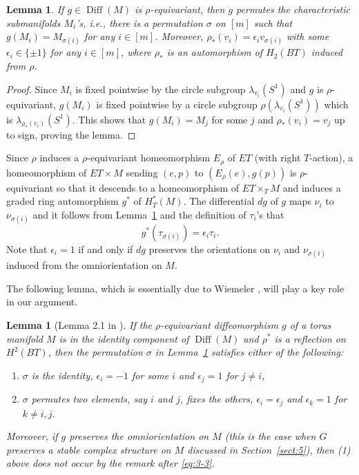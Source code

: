 \documentclass[12pt]{amsart}
\theoremstyle{plain} \numberwithin{equation}{section}
\newtheorem{lemm}[theo]{Lemma}
\theoremstyle{definition}
\def\fg{g}
\DeclareMathOperator{\Diff}{Diff}
\begin{document}
\begin{lemm} \label{lemm:3-3}
If $\fg\in \Diff(M)$ is $\rho$-equivariant, then $\fg$ permutes the characteristic submanifolds $M_i$'s, i.e., there is a permutation $\sigma$ on $[m]$ such that $\fg(M_i)=M_{\sigma(i)}$ for any $i\in [m]$.  Moreover, $\rho_*(v_i)=\epsilon_i v_{\sigma(i)}$ with some $\epsilon_i\in \{\pm 1\}$ for any $i\in [m]$, where $\rho_*$ is an automorphism of $H_2(BT)$ induced from $\rho$. 
\end{lemm}

\begin{proof}
Since $M_i$ is fixed pointwise by the circle subgroup $\lambda_{v_i}(S^1)$ and $\fg$ is $\rho$-equivariant, $\fg(M_i)$ is fixed pointwise by a circle subgroup $\rho(\lambda_{v_i}(S^1))$ which is $\lambda_{\rho_*(v_i)}(S^1)$.  This shows that $\fg(M_i)=M_j$ for some $j$ and $\rho_*(v_i)=v_j$ up to sign, proving the lemma. 
\end{proof}

Since $\rho$ induces a $\rho$-equivariant homeomorphism $E_\rho$ of $ET$ (with right $T$-action), a homeomorphism of $ET\times M$ sending $(e,p)$ to $(E_\rho(e), \fg(p))$ is $\rho$-equivariant so that it descends to a homeomorphism of $ET\times_T M$ and induces a graded ring automorphism $\fg^*$ of $H^*_T(M)$.  The differential $d\fg$ of $\fg$ maps $\nu_i$ to $\nu_{\sigma(i)}$ and it follows from Lemma~\ref{lemm:3-3} and the definition of $\tau_i$'s that 
\begin{equation} \label{eq:3-3}
\fg^*(\tau_{\sigma(i)})=\epsilon_i\tau_i.
\end{equation}
Note that $\epsilon_i=1$ if and only if $d\fg$ preserves the orientations on $\nu_i$ and $\nu_{\sigma(i)}$ induced from the omniorientation on $M$.

The following lemma, which is essentially due to Wiemeler \cite{wiem12}, will play a key role in our argument.  

\begin{lemm}[Lemma 2.1 in \cite{wiem12}] \label{lemm:3-4}
If the $\rho$-equivariant diffeomorphism $\fg$ of a torus manifold $M$ is in the identity component of $\Diff(M)$ and $\rho^*$ is a reflection on $H^2(BT)$, then the permutation $\sigma$ in Lemma~\ref{lemm:3-3} satisfies either of the following:
\begin{enumerate}
\item $\sigma$ is the identity, $\epsilon_i=-1$ for some $i$ and $\epsilon_j=1$ for $j\not=i$, %
\item $\sigma$ permutes two elements, say $i$ and $j$, fixes the others, $\epsilon_i=\epsilon_j$ and $\epsilon_k=1$ for $k\not=i,j$.%
\end{enumerate}
Moreover, if $\fg$ preserves the omniorientation on $M$ (this is the case when $G$ preserves a stable complex structure on $M$ discussed in Section~\ref{sect:5}), then (1) above does not occur by the remark after \eqref{eq:3-3}.  
\end{lemm}
\end{document}
